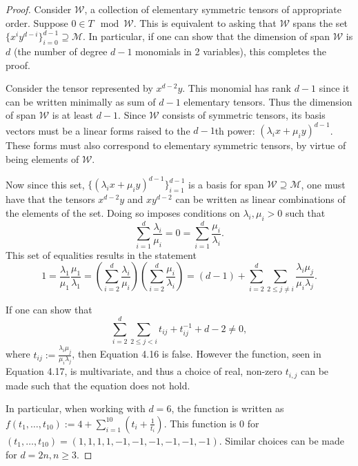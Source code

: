 \documentclass[../Lael_John_MasterThesis_Draft.tex]{subfiles}
\begin{document}
\begin{proof}
    Consider $\mathcal{W}$, a collection of elementary symmetric tensors of appropriate order. Suppose $0 \in T\mod\mathcal{W}$. This is equivalent to asking that $\mathcal{W}$ spans the set $\{x^iy^{d-i}\}_{i=0}^{d-1} \supseteq \mathcal{M}$. In particular, if one can show that the dimension of span $\mathcal{W}$ is $d$ (the number of degree $d-1$ monomials in 2 variables), this completes the proof.

    Consider the tensor represented by $x^{d-2}y$. This monomial has rank $d-1$ since it can be written minimally as sum of $d-1$ elementary tensors. Thus the dimension of span $\mathcal{W}$ is at least $d-1$. Since $\mathcal{W}$ consists of symmetric tensors, its basis vectors must be a linear forms raised to the $d-1$th power: $(\lambda_ix + \mu_iy)^{d-1}$. These forms must also correspond to elementary symmetric tensors, by virtue of being elements of $\mathcal{W}$. 

    Now since this set, $\{ (\lambda_ix + \mu_iy)^{d-1}\}_{i=1}^{d-1}$ is a basis for span $\mathcal{W} \supseteq \mathcal{M}$, one must have that the tensors $x^{d-2}y$ and $xy^{d-2}$ can be written as linear combinations of the elements of the set. Doing so imposes conditions on $\lambda_i, \mu_i > 0$ such that $$\sum_{i=1}^d \frac{\lambda_i}{\mu_i} = 0 = \sum_{i=1}^d \frac{\mu_i}{\lambda_i}.$$
    This set of equalities results in the statement \begin{equation}
        1 = \frac{\lambda_1}{\mu_1}\frac{\mu_1}{\lambda_1} = \left(\sum_{i=2}^d \frac{\lambda_i}{\mu_i}\right)\left(\sum_{i=2}^d \frac{\mu_i}{\lambda_i}\right) = (d-1) + \sum_{i=2}^d \sum_{2 \leq j\neq i} \frac{\lambda_i\mu_j}{\mu_i\lambda_j}.
    \end{equation} 
    
    If one can show that \begin{equation}
        \sum_{i=2}^d \sum_{2 \leq j < i} t_{ij} + t_{ij}^{-1} + d - 2\neq 0, 
    \end{equation} where $t_{ij} := \frac{\lambda_i\mu_j}{\mu_i\lambda_j}$, then Equation 4.16 is false. However the function, seen in Equation 4.17, is multivariate, and thus a choice of real, non-zero $t_{i,j}$ can be made such that the equation does not hold.
    
    In particular, when working with $d = 6$, the function is written as $f(t_1, \ldots, t_{10}) := 4 + \sum_{i=1}^{10} (t_i + \frac{1}{t_i})$. This function is $0$ for $(t_1, \ldots, t_{10}) = (1,1,1,1,-1,-1,-1,-1,-1,-1)$. Similar choices can be made for $d=2n, n\geq 3$. 
    

\end{proof}
\end{document}
